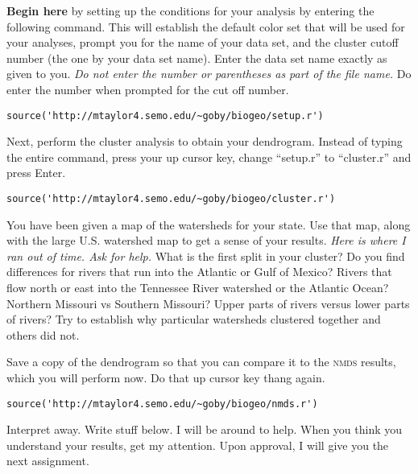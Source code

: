 \documentclass[11pt]{article}
\begin{document}
\textbf{Begin here} by setting up the conditions for your analysis by 
entering the following command.  This will establish the default color 
set that will be used for your analyses, prompt you for the name of your data set,
and the cluster cutoff number (the one by your data set name). Enter the data set
name exactly as given to you. \emph{Do not enter the number or parentheses as part of the file name.} 
Do enter the number when prompted for the cut off number.

\begin{verbatim}
source('http://mtaylor4.semo.edu/~goby/biogeo/setup.r')
\end{verbatim}

Next, perform the cluster analysis to obtain your dendrogram. Instead of typing the entire command,
press your up cursor key, change ``setup.r'' to ``cluster.r'' and press Enter.

\begin{verbatim}
source('http://mtaylor4.semo.edu/~goby/biogeo/cluster.r')
\end{verbatim}

You have been given a map of the watersheds for your state.  Use that map, along with the large U.S. watershed map to 
get a sense of your results. \emph{Here is where I ran out of time. Ask for help.} What is the first split in your cluster? Do you find differences for rivers that run into the Atlantic or Gulf of Mexico? Rivers that flow north or east into the Tennessee River watershed or the Atlantic Ocean? Northern Missouri vs Southern Missouri?  Upper parts of rivers versus lower parts of rivers? Try to establish why particular watersheds clustered together and others did not.

Save a copy of the dendrogram so that you can compare it to the \textsc{nmds} results, which you will perform now.
Do that up cursor key thang again.

\begin{verbatim}
source('http://mtaylor4.semo.edu/~goby/biogeo/nmds.r')
\end{verbatim}

Interpret away. Write stuff below. I will be around to help. When you think you understand your results, get my attention. Upon approval, I will give you the next assignment.
\end{document}
